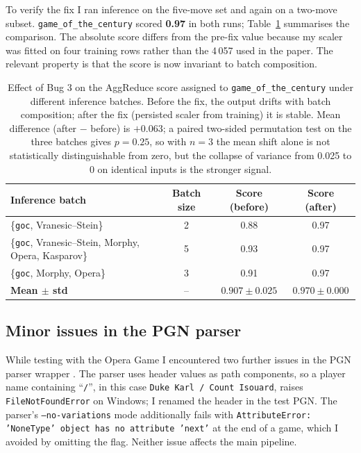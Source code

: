 \documentclass[11pt,a4paper]{article}
\begin{document}
To verify the fix I ran inference on the five-move set and again on a
two-move subset. \texttt{game\_of\_the\_century} scored \textbf{0.97}
in both runs; Table~\ref{tab:bug3} summarises the comparison. The
absolute score differs from the pre-fix value because my scaler was
fitted on four training rows rather than the 4\,057 used in the
paper. The relevant property is that the score is now invariant to
batch composition.

\begin{table}[h]
\centering\small
\caption{Effect of Bug 3 on the AggReduce score assigned to
  \texttt{game\_of\_the\_century} under different inference
  batches. Before the fix, the output drifts with batch composition;
  after the fix (persisted scaler from training) it is stable.
  Mean difference (after $-$ before) is $+0.063$; a paired two-sided
  permutation test on the three batches gives $p = 0.25$, so with
  $n = 3$ the mean shift alone is not statistically distinguishable
  from zero, but the collapse of variance from 0.025 to 0 on
  identical inputs is the stronger signal.}
\label{tab:bug3}
\begin{tabular}{@{}lccc@{}}
\toprule
\textbf{Inference batch} & \textbf{Batch size} &
\textbf{Score (before)} & \textbf{Score (after)} \\
\midrule
\{\texttt{goc}, Vranesic--Stein\}                      & 2 & 0.88 & 0.97 \\
\{\texttt{goc}, Vranesic--Stein, Morphy, Opera, Kasparov\} & 5 & 0.93 & 0.97 \\
\{\texttt{goc}, Morphy, Opera\}                         & 3 & 0.91 & 0.97 \\
\midrule
\textbf{Mean $\pm$ std}                                 & -- & $0.907 \pm 0.025$ & $0.970 \pm 0.000$ \\
\bottomrule
\end{tabular}
\end{table}

\subsection{Minor issues in the PGN parser}

While testing with the Opera Game I encountered two further issues in
the PGN parser wrapper \citep{pythonchess}. The parser uses header
values as path components, so a player name containing
``\texttt{/}'', in this case \texttt{Duke Karl / Count Isouard},
raises \texttt{FileNotFoundError} on Windows; I renamed the header in
the test PGN. The parser's \texttt{--no-variations} mode additionally
fails with \texttt{AttributeError: 'NoneType' object has no attribute
'next'} at the end of a game, which I avoided by omitting the flag.
Neither issue affects the main pipeline.
\end{document}
